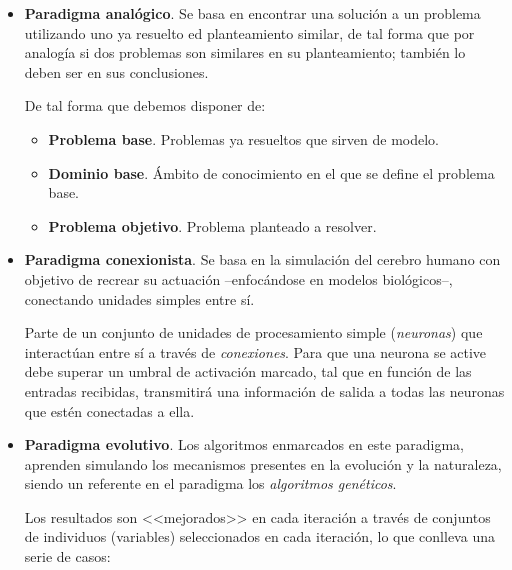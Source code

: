 \documentclass[a4paper, 11pt, titlepage]{article}
\begin{document}
            \begin{itemize}
                \item \textbf{Paradigma analógico}. Se basa en encontrar una solución a un problema 
                utilizando uno ya resuelto ed planteamiento similar, de tal forma que por analogía si 
                dos problemas son similares en su planteamiento; también lo deben ser en sus conclusiones.
                
                De tal forma que debemos disponer de:

                \begin{itemize}
                    \item \textbf{Problema base}. Problemas ya resueltos que sirven de modelo. 
                    \item \textbf{Dominio base}. Ámbito de conocimiento en el que se define 
                    el problema base.
                    \item \textbf{Problema objetivo}. Problema planteado a resolver.
                \end{itemize}

                \item \textbf{Paradigma conexionista}. Se basa en la simulación del cerebro 
                humano con objetivo de recrear su actuación --enfocándose en modelos biológicos--, 
                conectando unidades simples entre sí.

                Parte de un conjunto de unidades de procesamiento simple (\textit{neuronas}) 
                que interactúan entre sí a través de \textit{conexiones}. Para que una neurona 
                se active debe superar un umbral de activación marcado, tal que en función de 
                las entradas recibidas, transmitirá una información de salida a todas las neuronas 
                que estén conectadas a ella.
                
                \item \textbf{Paradigma evolutivo}. Los algoritmos enmarcados en este paradigma, 
                aprenden simulando los mecanismos presentes en la evolución y la naturaleza, siendo 
                un referente en el paradigma los \textit{algoritmos genéticos}. 

                Los resultados son <<mejorados>> en cada iteración a través de conjuntos de 
                individuos (variables) seleccionados en cada iteración, lo que conlleva una serie 
                de casos:


\end{itemize}
\end{document}
